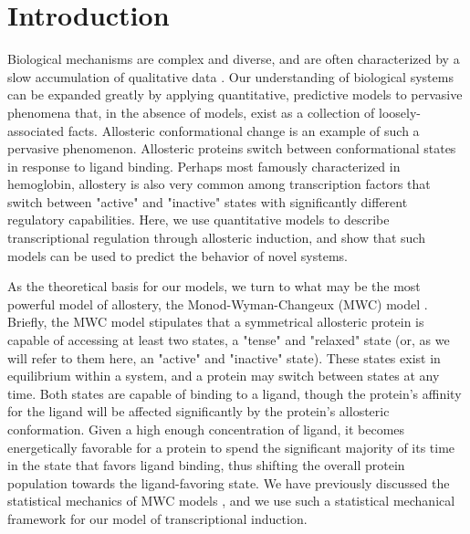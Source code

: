\section*{Introduction }

Biological mechanisms are complex and diverse, and are often characterized by a
slow accumulation of qualitative data . Our understanding of biological
systems can be expanded greatly by applying quantitative, predictive models to
pervasive phenomena that, in the absence of models, exist as a collection of
loosely-associated facts. Allosteric conformational change is an example of
such a pervasive phenomenon. Allosteric proteins switch between conformational
states in response to ligand binding. Perhaps most famously characterized in
hemoglobin, allostery is also very common among transcription factors that
switch between "active" and "inactive" states with significantly different
regulatory capabilities. Here, we use quantitative models to describe
transcriptional regulation through allosteric induction, and show that such
models can be used to predict the behavior of novel systems.

As the theoretical basis for our models, we turn to what may be the most powerful model of allostery, the Monod-Wyman-Changeux (MWC) model \cite{MONOD1965}.  Briefly, the MWC model stipulates that a symmetrical allosteric protein is capable of accessing at least two states, a "tense" and "relaxed" state (or, as we will refer to them here, an "active" and "inactive" state). These states exist in equilibrium within a system, and a protein may switch between states at any time. Both states are capable of binding to a ligand, though the protein's affinity for the ligand will be affected significantly by the protein's allosteric conformation. Given a high enough concentration of ligand, it becomes energetically favorable for a protein to spend the significant majority of its time in the state that favors ligand binding, thus shifting the overall protein population towards the ligand-favoring state. We have previously discussed the statistical mechanics of MWC models \cite{Marzen2013}, and we use such a statistical mechanical framework for our model of transcriptional induction. 

